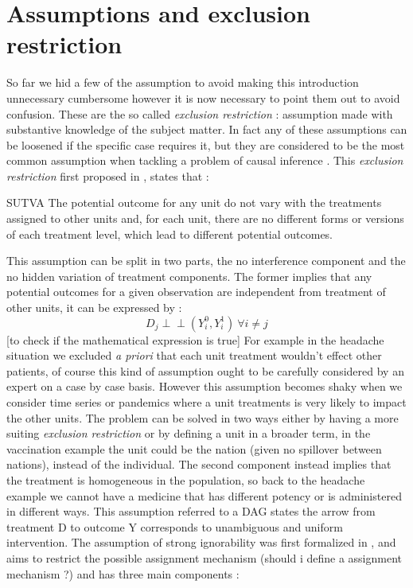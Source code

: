 \section{Assumptions and exclusion restriction}
So far we hid a few of the assumption to avoid making this introduction unnecessary cumbersome however it is now necessary to point them out to avoid confusion.
These are the so called \textit{exclusion  restriction} : assumption made with substantive knowledge of the subject matter. In fact any of these assumptions can be loosened if the specific case requires it, but they are considered to be the most common assumption when tackling a problem of causal inference \citep{imbens2015causal}.
This \textit{exclusion restriction} first proposed in  \citep{rubin1980randomization}, states that :
\begin{ass}{SUTVA}
The potential outcome for any unit do not vary with the treatments assigned to other units and, for each unit, there are no different forms or versions of each treatment level, which lead to different potential outcomes.
\label{sutva}
\end{ass}
\citep{imbens2015causal}
This assumption can be split in two parts, the no interference component and the no hidden variation of treatment components. The former implies that any potential outcomes for a given observation are independent from treatment of other units, it can be expressed by :
$$ D_j \perp\!\!\!\perp (Y^{0}_i,Y^{1}_i) \ \forall i \not = j $$ [to check if the mathematical expression is true]
For example in the headache situation we excluded \textit{a priori} that each unit treatment wouldn't effect other patients, of course this kind of assumption ought to be carefully considered  by an expert on a case by case basis.
However this assumption becomes shaky when we consider time series or pandemics where a unit treatments is very likely to impact the other units. The problem can be solved in two ways either by having a more suiting \textit{exclusion restriction} or by defining a unit in a broader term, in the vaccination example the unit could be the nation (given no spillover between nations), instead of the individual. 
The second component instead implies that the treatment is homogeneous in the population, so back to the headache example we cannot have a medicine that has different potency or is administered in different ways.
This assumption referred to a DAG states the arrow from treatment D to outcome Y corresponds to unambiguous and uniform intervention. 
The assumption of strong ignorability was first formalized in \citep{rosenbaum1983central} , and aims to restrict the possible assignment mechanism  (should i define a assignment mechanism ?) and has three main components :
